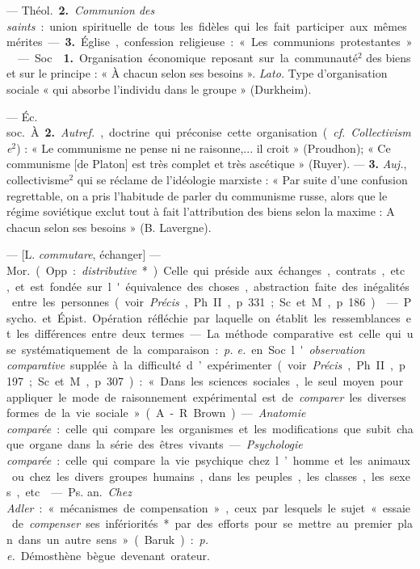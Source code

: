 \begin{itemize}[leftmargin=1cm, label=, itemsep=11pt]
— \si{Théol.} {\bf 2.} {\it Communion des
saints} : union spirituelle de tous les
fidèles qui les fait participer aux
mêmes mérites. — {\bf 3.} Église, confession religieuse : « Les communions
protestantes. »

 — Soc.  {\bf 1.} Organisation économique reposant sur la
communauté$^2$ des biens et sur le
principe : « À chacun selon ses besoins ». {\it Lato.} Type d'organisation
sociale « qui absorbe l’individu dans
le groupe » (Durkheim).

— \si{Éc. soc.} À. {\bf 2.} {\it Autref.}, doctrine
qui préconise cette organisation ({\it cf.} 
{\it Collectivisme}$^2$) : « Le communisme
ne pense ni ne raisonne,... il croit »
(Proudhon); « Ce communisme [de
Platon] est très complet et très ascétique » (Ruyer). — {\bf 3.} {\it Auj.}, collectivisme$^2$ qui se réclame de l’idéologie marxiste : « Par suite d’une
confusion regrettable, on a pris
l'habitude de parler du communisme russe, alors que le régime
soviétique exclut tout à fait l’attribution des biens selon la maxime :
A chacun selon ses besoins » (B. Lavergne).

 — [L. {\it commutare},
échanger] — \si{Mor.} (Opp. : {\it distributive}*). Celle qui préside aux échanges,
contrats, etc., et est fondée sur
l'équivalence des choses, abstraction faite des inégalités entre les
personnes (voir {\it Précis}, Ph. II,
p. 331; Sc. et M., p. 186).

 — \si{Psycho.} et \si{Épist.}
Opération réfléchie par laquelle on
établit les ressemblances et les différences entre deux termes. — La méthode comparative est celle qui use
systématiquement de la comparaison : {\it p. e.} en Soc. l'{\it observation comparative} supplée à la difficulté
d’expérimenter (voir {\it Précis}, Ph. II,
p. 197; Sc. et M., p. 307) : « Dans les
sciences sociales, le seul moyen pour
appliquer le mode de raisonnement
expérimental est de {\it comparer} les
diverses formes de la vie sociale »
(A.-R. Brown). — {\it Anatomie comparée} : celle qui compare les organismes et les modifications que
subit chaque organe dans la série
des êtres vivants. — {\it Psychologie
comparée} : celle qui compare la vie
psychique chez l’homme et les animaux ou chez les divers groupes
humains, dans les peuples, les
classes, les sexes, etc.

 — \si{Ps. an.} {\it Chez Adler} :
« mécanismes de compensation »,
ceux par lesquels le sujet « essaie de
{\it compenser} ses infériorités* par des
efforts pour se mettre au premier
plan dans un autre sens » (Baruk) :
{\it p. e.} Démosthène bègue devenant
orateur.


\end{itemize}
